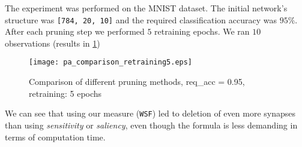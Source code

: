 The experiment was performed on the MNIST dataset. The initial network's structure was \texttt{[784, 20, 10]} and the required classification accuracy was $ 95\% $. After each pruning step we performed $ 5 $ retraining epochs. We ran $ 10 $ observations (results in \cref{fig:discussion:pa_comparison_retraining5}) 

\begin{figure}[H]
\centering
\texttt{[image: pa\_comparison\_retraining5.eps]}
\caption{Comparison of different pruning methods, req\_acc = 0.95, retraining: 5 epochs}
\label{fig:discussion:pa_comparison_retraining5}
\end{figure}

We can see that using our measure (\texttt{WSF}) led to deletion of even more synapses than using \textit{sensitivity} or \textit{saliency}, even though the formula is less demanding in terms of computation time.